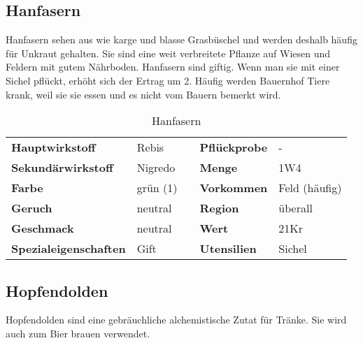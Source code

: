 \subsection{Hanfasern}
Hanfasern sehen aus wie karge und blasse Grasbüschel und werden deshalb häufig für Unkraut gehalten. Sie sind eine weit verbreitete Pflanze auf Wiesen und Feldern mit gutem Nährboden. Hanfasern sind giftig. Wenn man sie mit einer Sichel pflückt, erhöht sich der Ertrag um 2. Häufig werden Bauernhof Tiere krank, weil sie sie essen und es nicht vom Bauern bemerkt wird.

\begin{table}[H] 
\begin{center} 
\begin{tabular}{|l|l|p{1cm}|l|l|} 
  	\cline{1-2} \cline{4-5} 
  	\textbf{Hauptwirkstoff} & Rebis && \textbf{Pflückprobe} & - \\ \cline{1-2} \cline{4-5} 
  	\textbf{Sekundärwirkstoff} & Nigredo && \textbf{Menge} & 1W4 \\ \cline{1-2} \cline{4-5} 
  	\textbf{Farbe} & grün (1) && \textbf{Vorkommen} & Feld (häufig) \\ \cline{1-2} \cline{4-5} 
  	\textbf{Geruch} & neutral && \textbf{Region} & überall \\ \cline{1-2} \cline{4-5} 
  	\textbf{Geschmack} & neutral && \textbf{Wert} & 21Kr \\ \cline{1-2} \cline{4-5} 
  	\textbf{Spezialeigenschaften} & Gift && \textbf{Utensilien} & Sichel \\ \cline{1-2} \cline{4-5} 
\end{tabular} 
\end{center} 
\caption{Hanfasern} 
\label{tab:hanfasern} 
\end{table}


\subsection{Hopfendolden}
Hopfendolden sind eine gebräuchliche alchemistische Zutat für Tränke. Sie wird auch zum Bier brauen verwendet.


